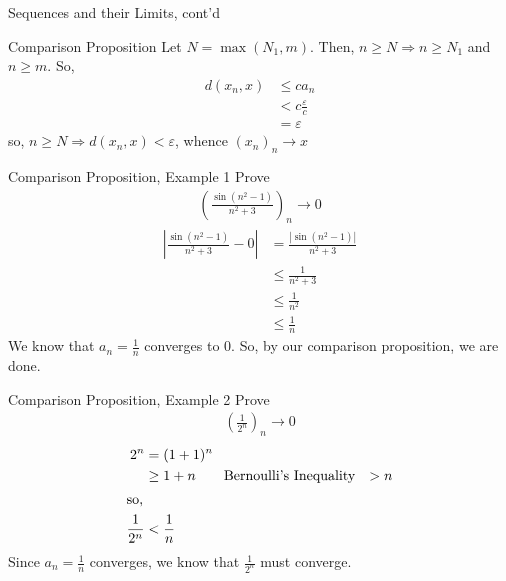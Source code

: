 \documentclass[8pt]{extarticle}
\begin{document}
\begin{problem}{Sequences and their Limits, cont'd}
\begin{problem}{Comparison Proposition}
      Let $N = \max(N_1,m)$. Then, $n \geq N\Rightarrow n\geq N_1$ and $n\geq m$. So,
      \begin{align*}
        d(x_n,x) &\leq ca_n\\
        &< c\frac{\varepsilon}{c}\\
        &=\varepsilon
      \end{align*}
      so, $n\geq N \Rightarrow d(x_n,x) < \varepsilon$, whence $(x_n)_n \rightarrow x$
    \end{problem}
    \begin{problem}{Comparison Proposition, Example 1}
      Prove
      \begin{align*}
        \left(\frac{\sin(n^2-1)}{n^2 + 3}\right)_n \rightarrow 0
      \end{align*}
      \tcblower
      \begin{align*}
        \left|\frac{\sin(n^2 - 1)}{n^2 + 3} - 0\right| &= \frac{|\sin(n^2 - 1)|}{n^2 + 3}\\
                                                       &\leq \frac{1}{n^2 + 3}\\
                                                       &\leq \frac{1}{n^2}\\
                                                       &\leq \frac{1}{n}
      \end{align*}
      We know that $a_n = \frac{1}{n}$ converges to $0$. So, by our comparison proposition, we are done.
    \end{problem}
    \begin{problem}{Comparison Proposition, Example 2}
      Prove
      \begin{align*}
        \left(\frac{1}{2^n}\right)_n \rightarrow 0
      \end{align*}
      \tcblower
      \begin{align*}
        2^n &= (1+1)^n\\
            &\geq 1+n\tag*{Bernoulli's Inequality}
            &>n\\
            \shortintertext{so,}
        \frac{1}{2^n} &< \frac{1}{n}
      \end{align*}
      Since $a_n = \frac{1}{n}$ converges, we know that $\frac{1}{2^n}$ must converge.
    \end{problem}
  \end{problem}
\end{document}
